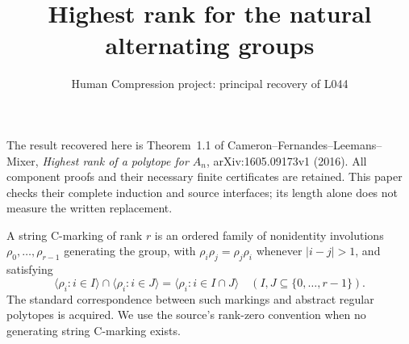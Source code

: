 \documentclass[11pt,a4paper]{article}
\title{Highest rank for the natural alternating groups}
\author{Human Compression project: principal recovery of L044}
\date{}
\newcommand{\gen}[1]{\langle#1\rangle}
\begin{document}
\maketitle
The result recovered here is Theorem~1.1 of
Cameron--Fernandes--Leemans--Mixer, \emph{Highest rank of a polytope
for $A_n$}, arXiv:1605.09173v1 (2016). All component proofs and
their necessary finite certificates are retained. This paper checks
their complete induction and source interfaces; its length alone
does not measure the written replacement.

A string C-marking of rank $r$ is an ordered family of nonidentity
involutions $\rho_0,\ldots,\rho_{r-1}$ generating the group, with
$\rho_i\rho_j=\rho_j\rho_i$ whenever $|i-j|>1$, and satisfying
\[
 \gen{\rho_i:i\in I}\cap\gen{\rho_i:i\in J}
       =\gen{\rho_i:i\in I\cap J}
       \quad(I,J\subseteq\{0,\ldots,r-1\}).
\]
The standard correspondence between such markings and abstract
regular polytopes is acquired. We use the source's rank-zero
convention when no generating string C-marking exists.
\end{document}
